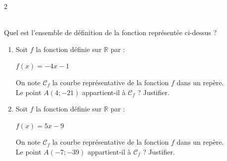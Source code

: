 {\begin{multicols}{2}
\begin{Exercice}
\begin{tikzpicture}[scale=.6]
\end{tikzpicture}\\Quel est l'ensemble de définition de la fonction représentée ci-dessus ?
\end{Exercice}

\end{multicols}

\newpage

\begin{Exercice}%
\leavevmode\vspace{-\baselineskip}
\begin{enumerate}[itemsep=1em]
	\item \begin{minipage}[t]{\linewidth}Soit $f$ la fonction définie sur $\mathbb{R}$ par :
              \begin{center}
$f(x)=-4x-1$
\end{center}
              On note $\mathscr{C}_f$ la courbe représentative de la fonction $f$ dans un repère.\\
              Le point $A(4; -21)$ appartient-il à $\mathscr{C}_f$ ? Justifier.\end{minipage}
	\item \begin{minipage}[t]{\linewidth}Soit $f$ la fonction définie sur $\mathbb{R}$ par :
              \begin{center}
$f(x)=5x-9$
\end{center}
              On note $\mathscr{C}_f$ la courbe représentative de la fonction $f$ dans un repère.\\
              Le point $A(-7; -39)$ appartient-il à $\mathscr{C}_f$ ? Justifier.\end{minipage}
\end{enumerate}
\vspace{-0.5cm}
\end{Exercice}



}
